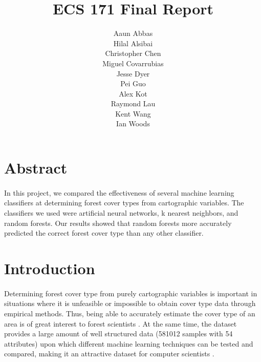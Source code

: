 \documentclass[11pt]{article}
\begin{document}
\begin{titlepage}
\title{\Huge ECS 171 Final Report}
\author{\huge Aaun Abbas\\\huge Hilal Alsibai\\\huge Christopher Chen\\\huge Miguel Covarrubias\\\huge Jesse Dyer\\\huge Pei Guo\\\huge Alex Kot\\\huge Raymond Lau\\\huge Kent Wang\\\huge Ian Woods}
\maketitle
\end{titlepage}

\section{Abstract}
\paragraph{}
In this project, we compared the effectiveness of several machine learning classifiers at determining forest cover types from cartographic variables. The classifiers we used were artificial neural networks, k nearest neighbors, and random forests. Our results showed that random forests more accurately predicted the correct forest cover type than any other classifier. 
\section{Introduction}
\paragraph{}
Determining forest cover type from purely cartographic variables is important in situations where it is unfeasible or impossible to obtain cover type data through empirical methods. Thus, being able to accurately estimate the cover type of an area is of great interest to forest scientists \cite{blackard00}.  At the same time, the dataset provides a large amount of well structured data (581012 samples with 54 attributes) upon which different machine learning techniques can be tested and compared, making it an attractive dataset for computer scientists \cite{gama03,oza01,giannella,furnkranz,obradovic,klami}.
\end{document}
